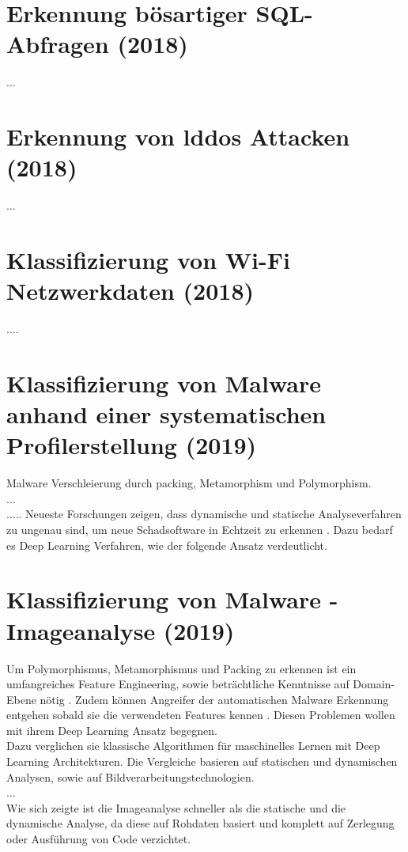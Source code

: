 \documentclass[
    12pt, %
    DIV10,
    ngerman, %
    a4paper, %
    oneside, %
    titlepage, %
    parskip=half, %
    headings=normal, %
    listof=totoc, %
    bibliography=totoc, %
    index=totoc, %
    captions=tableheading, %
    final %
]{scrreprt}
\begin{document}
\section{Erkennung bösartiger SQL-Abfragen (2018)}
\textcite{Jayaprakash2018}...
%
\section{Erkennung von \ac{lddos} Attacken (2018)}
\textcite{siracusano2018detection}...
%
\section{Klassifizierung von Wi-Fi Netzwerkdaten (2018)}
\textcite{Qin2018}....
%
%
\section{Klassifizierung von Malware anhand einer systematischen Profilerstellung (2019)}
\textcite{he2017model} Malware Verschleierung durch packing, Metamorphism und Polymorphism.\\
\textcite{Han2019}...\\
.....
Neueste Forschungen zeigen, dass dynamische und statische Analyseverfahren zu ungenau sind, um neue Schadsoftware in Echtzeit zu erkennen \parencite{Vinayakumar2019}. Dazu bedarf es Deep Learning Verfahren, wie der folgende Ansatz verdeutlicht.
%
\section{Klassifizierung von Malware - Imageanalyse (2019)}
Um Polymorphismus, Metamorphismus und Packing zu erkennen ist ein umfangreiches Feature Engineering, sowie beträchtliche Kenntnisse auf Domain-Ebene nötig \parencite{rhode2018early}. Zudem können Angreifer der automatischen Malware Erkennung entgehen sobald sie die verwendeten Features kennen \parencite{anderson2017evading}. Diesen Problemen wollen \textcite{Vinayakumar2019} mit ihrem Deep Learning Ansatz begegnen.\\
Dazu verglichen sie klassische Algorithmen für maschinelles Lernen mit Deep Learning Architekturen. Die Vergleiche basieren auf statischen und dynamischen Analysen, sowie auf Bildverarbeitungstechnologien.\\
...\\ 
Wie sich zeigte ist die Imageanalyse schneller als die statische und die dynamische Analyse, da diese auf Rohdaten basiert und komplett auf Zerlegung oder Ausführung von Code verzichtet.
\end{document}
